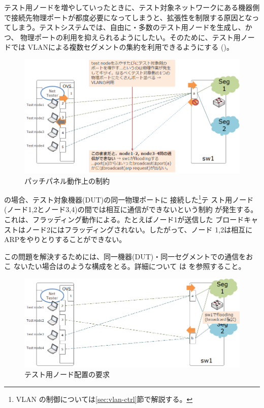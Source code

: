 テスト用ノードを増やしていったときに、テスト対象ネットワークにある機器側
で接続先物理ポートが都度必要になってしまうと、拡張性を制限する原因となっ
てしまう。テストシステムでは、自由に・多数のテスト用ノードを生成し、かつ、
物理ポートの利用を抑えられるようにしたい。そのために、テスト用ノードでは
VLANによる複数セグメントの集約を利用できるようにする
()。

\begin{figure}[h]
 \centering
 \includegraphics[scale=0.6]{img/l2bcctrl_req2.png}
 \caption{パッチパネル動作上の制約}
 \label{fig:l2bcctrl_req2}
\end{figure}

の場合、テスト対象機器(DUT)の同一物理ポートに
接続した\footnote{VLAN の制御については\ref{sec:vlan-ctrl}節で解説する。}テ
スト用ノード(ノード1,2とノード3,4)の間では相互に通信ができないという制約
が発生する。これは、フラッディング動作による。たとえばノード1が送信した
ブロードキャストはノード2にはフラッディングされない。したがって、ノード
1,2は相互にARPをやりとりすることができない。

この問題を解決するためには、同一機器(DUT)・同一セグメントでの通信をおこ
ないたい場合はのような構成をとる。詳細について
は \lopjtech を参照すること。

\begin{figure}[h]
 \centering
 \includegraphics[scale=0.6]{img/l2bcctrl_req3.png}
 \caption{テスト用ノード配置の要求}
 \label{fig:l2bcctrl_req3}
\end{figure}

